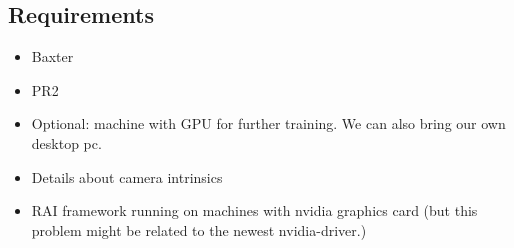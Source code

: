 \documentclass[a4paper]{article}
\begin{document}
\subsection*{Requirements}
\begin{itemize}
    \item Baxter
    \item PR2
    \item Optional: machine with GPU for further training. We can also bring our own desktop pc.
    \item Details about camera intrinsics
    \item RAI framework running on machines with nvidia graphics card (but this problem might be related to the newest nvidia-driver.)
\end{itemize}
\end{document}
